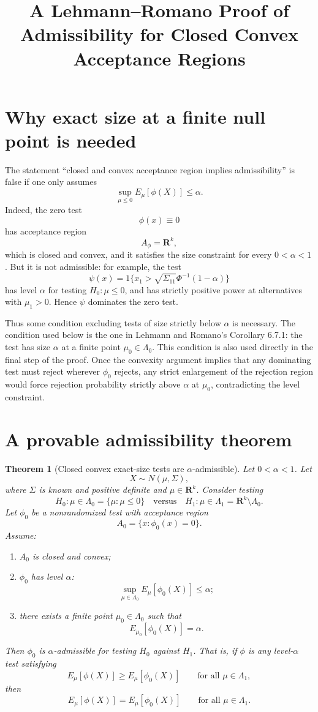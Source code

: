 \documentclass[11pt]{article}
\title{A Lehmann--Romano Proof of Admissibility for Closed Convex Acceptance Regions}
\date{}
\newtheorem{theorem}{Theorem}
\begin{document}
\maketitle

\section{Why exact size at a finite null point is needed}

The statement ``closed and convex acceptance region implies admissibility'' is false if one only assumes
\[
\sup_{\mu\le 0} E_\mu[\phi(X)]\le \alpha.
\]
Indeed, the zero test
\[
\phi(x)\equiv 0
\]
has acceptance region
\[
A_\phi=\mathbf R^k,
\]
which is closed and convex, and it satisfies the size constraint for every \(0<\alpha<1\). But it is not admissible: for example, the test
\[
\psi(x)=1\{x_1>\sqrt{\Sigma_{11}}\Phi^{-1}(1-\alpha)\}
\]
has level \(\alpha\) for testing \(H_0:\mu\le 0\), and has strictly positive power at alternatives with \(\mu_1>0\). Hence \(\psi\) dominates the zero test.

Thus some condition excluding tests of size strictly below \(\alpha\) is necessary. The condition used below is the one in Lehmann and Romano's Corollary 6.7.1: the test has size \(\alpha\) at a finite point \(\mu_0\in\Lambda_0\). This condition is also used directly in the final step of the proof. Once the convexity argument implies that any dominating test must reject wherever \(\phi_0\) rejects, any strict enlargement of the rejection region would force rejection probability strictly above \(\alpha\) at \(\mu_0\), contradicting the level constraint.

\section{A provable admissibility theorem}

\begin{theorem}[Closed convex exact-size tests are \(\alpha\)-admissible]
Let \(0<\alpha<1\). Let
\[
X\sim N(\mu,\Sigma),
\]
where \(\Sigma\) is known and positive definite and \(\mu\in\mathbf R^k\). Consider testing
\[
H_0:\mu\in\Lambda_0=\{\mu:\mu\le 0\}
\quad\text{versus}\quad
H_1:\mu\in\Lambda_1=\mathbf R^k\setminus\Lambda_0.
\]
Let \(\phi_0\) be a nonrandomized test with acceptance region
\[
A_0=\{x:\phi_0(x)=0\}.
\]
Assume:
\begin{enumerate}[label=(\roman*)]
\item \(A_0\) is closed and convex;
\item \(\phi_0\) has level \(\alpha\):
\[
\sup_{\mu\in\Lambda_0} E_\mu[\phi_0(X)]\le \alpha;
\]
\item there exists a finite point \(\mu_0\in\Lambda_0\) such that
\[
E_{\mu_0}[\phi_0(X)]=\alpha.
\]
\end{enumerate}
Then \(\phi_0\) is \(\alpha\)-admissible for testing \(H_0\) against \(H_1\). That is, if \(\phi\) is any level-\(\alpha\) test satisfying
\[
E_\mu[\phi(X)]\ge E_\mu[\phi_0(X)]
\qquad\text{for all }\mu\in\Lambda_1,
\]
then
\[
E_\mu[\phi(X)]=E_\mu[\phi_0(X)]
\qquad\text{for all }\mu\in\Lambda_1.
\]
\end{theorem}
\end{document}
